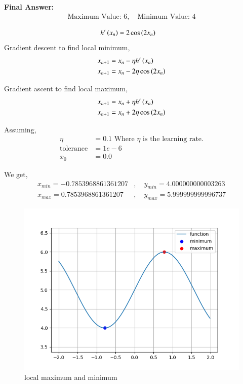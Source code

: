 \documentclass[journal]{IEEEtran}
\begin{document}
\textbf{Final Answer:}
\begin{align}
    \text{Maximum Value: } 6, \quad \text{Minimum Value: } 4
\end{align}



\solution
\begin{align}
    h^\prime\left(x_{n}\right) &= 2\cos{\ensuremath{\left(2x_{n}\right)}}
\end{align}
Gradient descent to find local minimum,
\begin{align}
    x_{n+1} &= x_{n} - \eta h^\prime\left(x_{n}\right) \\
    x_{n+1} &= x_{n} - 2\eta \cos{\ensuremath{\left(2x_{n}\right)}}
\end{align}

Gradient ascent to find local maximum,
\begin{align}
    x_{n+1} &= x_{n} + \eta h^\prime\left(x_{n}\right) \\
    x_{n+1} &= x_{n} + 2\eta \cos{\ensuremath{\left(2x_{n}\right)}}
\end{align}



Assuming,
\begin{align}
    \eta &= 0.1   \text{  Where $\eta$ is the learning rate.}\\ 
    \text{tolerance} &= 1e-6 \\
    x_{0} &= 0.0
\end{align}

We get,
\begin{align}
    x_{min} = -0.7853968861361207&,\quad y_{min} = 4.000000000003263 \\
    x_{max} = 0.7853968861361207&,\quad y_{max} = 5.999999999996737
\end{align}

\begin{figure}[ht]
    \centering
    \includegraphics[width=\columnwidth]{figs/plot.png}
    \caption{local maximum and minimum}
    \label{fig:Plot1}
    \end{figure}
\end{document}
